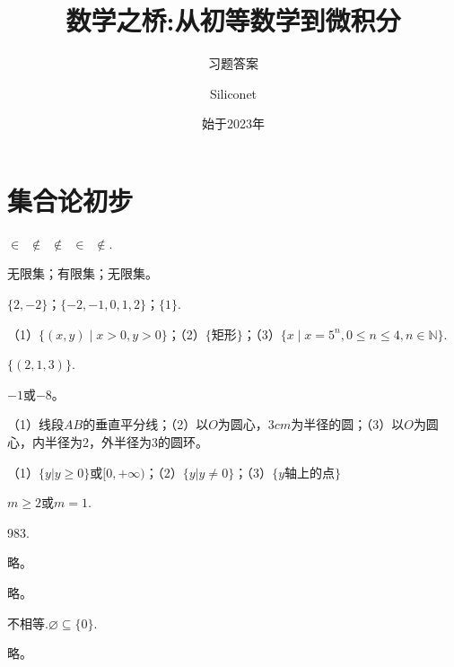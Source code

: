 \documentclass[lang=cn,newtx,10pt,scheme=chinese]{elegantbook}
\title{数学之桥:从初等数学到微积分}
\subtitle{习题答案}
\author{Siliconet}
\date{始于2023年}
\begin{document}
\maketitle
\frontmatter

\tableofcontents

\mainmatter

\chapter{集合论初步}
\begin{exercise}
  $\in\enspace\notin\enspace\notin\enspace\in\enspace\notin$.
\end{exercise}
\begin{exercise}
  无限集；有限集；无限集。
\end{exercise}
\begin{exercise}
  $\{2,-2\}$；$\{-2,-1,0,1,2\}$；$\{1\}$.
\end{exercise}
\begin{exercise}
  （1）$\{(x,y)\mid x>0,y>0\}$；（2）$\{\text{矩形}\}$；（3）$\{x\mid x=5^n,0\leq n\leq 4,n\in\mathbb{N}\}$.
\end{exercise}
\begin{exercise}
  $\{(2,1,3)\}$.
\end{exercise}
\begin{exercise}
  $-1$或$-8$。
\end{exercise}
\begin{exercise}
  （1）线段$AB$的垂直平分线；（2）以$O$为圆心，$3cm$为半径的圆；（3）以$O$为圆心，内半径为2，外半径为3的圆环。
\end{exercise}
\begin{exercise}
  （1）$\{y|y\geqslant0\}$或$[0,+\infty)$；（2）$\{y|y\neq0\}$；（3）$\{y\text{轴上的点}\}$
\end{exercise}
\begin{exercise}
  $m\geqslant2\text{或}m=1$.
\end{exercise}
\begin{exercise}
  983.
\end{exercise}
\begin{exercise}
  略。
\end{exercise}
\begin{exercise}
  略。
\end{exercise}
\begin{exercise}
  不相等.$\varnothing\subseteq\{0\}.$
\end{exercise}
\begin{exercise}
  略。
\end{exercise}
\end{document}

